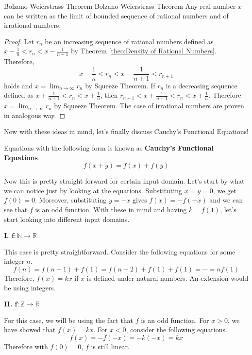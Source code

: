 \documentclass[../../main.tex]{subfiles}
\begin{document}
\begin{theorem}
{Bolzano-Weierstrass Theorem}
{Bolzano-Weierstrass Theorem}
Any real number $x$ can be written as the limit of bounded
sequence of rational numbers and of irrational numbers.
\end{theorem}
\begin{proof}
Let $r_n$ be an increasing sequence of rational numbers
defined as $x - \frac{1}{n} < r_n < x - \frac{1}{n+1}$ by
Theorem \ref{theo:Density of Rational Numbers}. Therefore,
\[
x - \frac{1}{n}
< r_n
< x - \frac{1}{n + 1}
< r_{n+1}
\]
holds and $x = \lim_{n \to \infty} r_n$ by Squeeze Theorem.
If $r_n$ is a decreasing sequence defined as
$x + \frac{1}{n+1} < r_n < x + \frac{1}{n}$, then
$r_{n+1} < x + \frac{1}{n+1} < r_n < x + \frac{1}{n}$.
Therefore $x = \lim_{n \to \infty} r_n$ by Squeeze Theorem.
The case of irrational numbers are proven in analogous way.
\end{proof}

Now with these ideas in mind, let's finally discuss
Cauchy's Functional Equations!

\begin{definition}{}{}
Equations with the following form is known as
\textbf{Cauchy's Functional Equations}.
\[
f(x + y) = f(x) + f(y)
\]
\end{definition}

Now this is pretty straight forward for certain input domain.
Let's start by what we can notice just by looking at the
equations. Substituting $x = y = 0$, we get $f(0) = 0$.
Moreover, substituting $y = -x$ gives $f(x) = -f(-x)$ and we
can see that $f$ is an odd function. With these in mind and having
$k = f(1)$, let's start looking into different input domains.

{\Large\textcolor{BrickRed}
{\textbf{I. $\mathbf{f: \mathbb{N} \to \mathbb{R}}$}}}

This case is pretty straightforward. Consider the following
equations for some integer $n$.
\[
f(n)
= f(n - 1) + f(1)
= f(n - 2) + f(1) + f(1)
= \cdots
= n f(1)
\]
Therefore, $f(x) = kx$ if $x$ is defined under natural numbers.
An extension would be using integers.

{\Large\textcolor{BrickRed}
{\textbf{II. $\mathbf{f: \mathbb{Z} \to \mathbb{R}}$}}}

For this case, we will be using the fact that $f$ is an odd function.
For $x > 0$, we have showed that $f(x) = kx$. For $x < 0$,
consider the following equations.
\[
f(x) = -f(-x) = -k(-x) = kx
\]
Therefore with $f(0) = 0$, $f$ is still linear.
\end{document}
